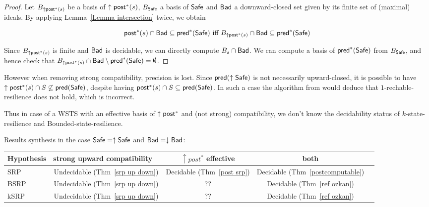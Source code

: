 \begin{proof}
Let $B_{\uparrow \textsf{post}^*(s)}$ 
 be a basis of $\uparrow \textsf{post}^*(s)$, $B_{\textsf{Safe}}$ a basis of $\textsf{Safe}$
and $\textsf{Bad}$ a downward-closed set given by its finite set of (maximal) ideals.
By applying Lemma~\ref{Lemma intersection} twice, we obtain

$$ \textsf{post}^*(s) \cap \textsf{Bad} \subseteq \textsf{pred}^*(\textsf{Safe}) \text{ iff } B_{\uparrow \textsf{post}^*(s)} \cap \textsf{Bad} \subseteq \textsf{pred}^*(\textsf{Safe})$$

Since $B_{\uparrow \textsf{post}^*(s)}$ is finite and $\textsf{Bad}$ is decidable, we can directly compute $ B_s \cap \textsf{Bad}$.
We can compute a basis of $\textsf{pred}^*(\textsf{Safe})$ from $B_{\textsf{Safe}}$, and hence check that $B_{\uparrow \textsf{post}^*(s)} \cap \textsf{Bad} \setminus \textsf{pred}^*(\textsf{Safe}) = \emptyset$. 
\end{proof}

%
%



However when removing strong compatibility, precision is lost.
Since $\textsf{pred}(\uparrow \textsf{Safe})$ is not necessarily upward-closed, it is possible to have 
 $\uparrow \textsf{post}^* (s) \cap S \not\subseteq \textsf{pred}(\textsf{Safe})$,
despite having 
$\textsf{post}^* (s) \cap S \subseteq \textsf{pred}( \textsf{Safe})$.
In such a case the algorithm from
\cite{DBLP:conf/gg/Ozkan22} would deduce that $1$-rechable-resilience does not hold,
which is incorrect.

Thus in case of a WSTS with an effective basis of $\uparrow \textsf{post}^*$ and (not strong) compatibility, we don't know the decidability status of {\sc $k$-state-resilience} and 
{\sc Bounded-state-resilience}. 


Results synthesis in the case $\textsf{Safe} = \uparrow \textsf{Safe}$ and $\textsf{Bad} = \downarrow \textsf{Bad}$:


\begin{center}
\begin{tabular}{ | l | c | c | c | c |}
\hline  Hypothesis & strong upward compatibility ~ & $\uparrow post^*$ effective & both  \\ \hline
   SRP & Undecidable (Thm~\ref{srp up down}) & Decidable (Thm~\ref{post srp})  & Decidable (Thm~\ref{postcomputable})\\ \hline
   BSRP & Undecidable (Thm~\ref{srp up down}) &  ??  & Decidable (Thm~\ref{ref ozkan}) \\ \hline
      kSRP & Undecidable (Thm~\ref{srp up down}) & ?? & Decidable (Thm~\ref{ref ozkan}) \\ \hline
 \end{tabular}
\end{center}


